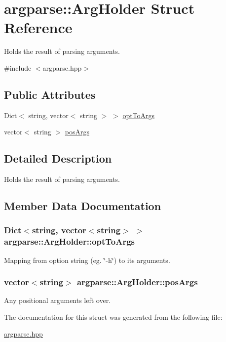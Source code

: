 \hypertarget{structargparse_1_1_arg_holder}{\section{argparse\-:\-:Arg\-Holder Struct Reference}
\label{structargparse_1_1_arg_holder}
}


Holds the result of parsing arguments.  




{\ttfamily \#include $<$argparse.\-hpp$>$}

\subsection*{Public Attributes}
\begin{DoxyCompactItemize}
\item 
Dict$<$ string, vector$<$ string $>$ $>$ \hyperlink{structargparse_1_1_arg_holder_a930d6a9ba59a528783ea4df3410656ab}{opt\-To\-Args}
\item 
vector$<$ string $>$ \hyperlink{structargparse_1_1_arg_holder_a3154d09426a4270992d6b54cc1eb2927}{pos\-Args}
\end{DoxyCompactItemize}


\subsection{Detailed Description}
Holds the result of parsing arguments. 

\subsection{Member Data Documentation}
\hypertarget{structargparse_1_1_arg_holder_a930d6a9ba59a528783ea4df3410656ab}{
\subsubsection[{opt\-To\-Args}]{\setlength{\rightskip}{0pt plus 5cm}Dict$<$string, vector$<$string$>$ $>$ {\bf argparse\-::\-Arg\-Holder\-::opt\-To\-Args}}}\label{structargparse_1_1_arg_holder_a930d6a9ba59a528783ea4df3410656ab}
Mapping from option string (eg. \char`\"{}-\/h\char`\"{}) to its arguments. \hypertarget{structargparse_1_1_arg_holder_a3154d09426a4270992d6b54cc1eb2927}{
\subsubsection[{pos\-Args}]{\setlength{\rightskip}{0pt plus 5cm}vector$<$string$>$ {\bf argparse\-::\-Arg\-Holder\-::pos\-Args}}}\label{structargparse_1_1_arg_holder_a3154d09426a4270992d6b54cc1eb2927}
Any positional arguments left over. 

The documentation for this struct was generated from the following file\-:\begin{DoxyCompactItemize}
\item 
\hyperlink{argparse_8hpp}{argparse.\-hpp}\end{DoxyCompactItemize}

